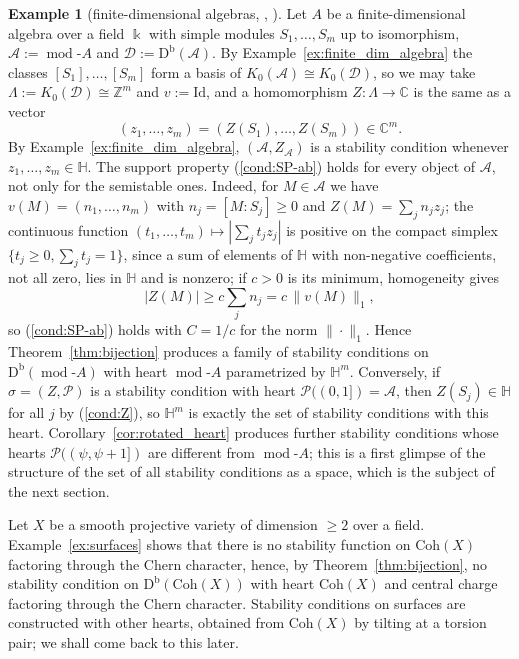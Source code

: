 \documentclass[12pt]{amsart}
\newcommand{\condref}[1]{\textup{(\ref{#1})}}
\newenvironment{remark}{{\textbf{Remark.}}}
\numberwithin{theorem}{section}
\theoremstyle{definition}
\newtheorem{example}[theorem]{Example}
\newcommand{\D}{\mathrm{D}}
\newcommand{\CC}{\mathbb{C}}
\newcommand{\ZZ}{\mathbb{Z}}
\newcommand{\HH}{\mathbb{H}}
\newcommand{\calA}{\mathcal{A}}
\newcommand{\calP}{\mathcal{P}}
\newcommand{\kk}{\Bbbk}
\newcommand{\id}{\mathrm{Id}}
\newcommand{\Kgroup}{K_0}
\newcommand{\calD}{\mathcal{D}}
\begin{document}
	\begin{example}[finite-dimensional algebras, {\cite[Example~5.5]{Bri07}}, {\cite[Exercise~5.13]{MS17}}]
		\label{ex:algebras_bridgeland}
		Let $A$ be a finite-dimensional algebra over a field $\kk$ with simple modules $S_1, \ldots, S_m$ up to isomorphism, $\calA := \operatorname{mod}\text{-}A$ and $\calD := \D^{\mathrm{b}}(\calA)$.
		By Example~\ref{ex:finite_dim_algebra} the classes $[S_1], \ldots, [S_m]$ form a basis of $\Kgroup(\calA) \cong \Kgroup(\calD)$, so we may take $\Lambda := \Kgroup(\calD) \cong \ZZ^m$ and $v := \id$, and a homomorphism $Z \colon \Lambda \to \CC$ is the same as a vector 
		\[
		(z_1, \ldots, z_m) = (Z(S_1), \ldots, Z(S_m)) \in \CC^m.
		\]
		By Example~\ref{ex:finite_dim_algebra}, $(\calA, Z_{\calA})$ is a stability condition whenever $z_1, \ldots, z_m \in \HH$.
		The support property \condref{cond:SP-ab} holds for every object of $\calA$, not only for the semistable ones.
		Indeed, for $M \in \calA$ we have $v(M) = (n_1, \ldots, n_m)$ with $n_j = [M : S_j] \geqslant 0$ and $Z(M) = \sum_j n_j z_j$;
		the continuous function $(t_1, \ldots, t_m) \mapsto |\sum_j t_j z_j|$ is positive on the compact simplex $\{ t_j \geqslant 0, \sum_j t_j = 1 \}$, since a sum of elements of $\HH$ with non-negative coefficients, not all zero, lies in $\HH$ and is nonzero;
		if $c > 0$ is its minimum, homogeneity gives 
		\[
		|Z(M)| \geqslant c \sum_j n_j = c \, \| v(M) \|_1,
		\] 
		so \condref{cond:SP-ab} holds with $C = 1 / c$ for the norm $\| \cdot \|_1$.
		Hence Theorem~\ref{thm:bijection} produces a family of stability conditions on $\D^{\mathrm{b}}(\operatorname{mod}\text{-}A)$ with heart $\operatorname{mod}\text{-}A$ parametrized by $\HH^m$.
		Conversely, if $\sigma = (Z, \calP)$ is a stability condition with heart $\calP((0, 1]) = \calA$, then $Z(S_j) \in \HH$ for all $j$ by \condref{cond:Z}, so $\HH^m$ is exactly the set of stability conditions with this heart.
		Corollary~\ref{cor:rotated_heart} produces further stability conditions whose hearts $\calP((\psi, \psi + 1])$ are different from $\operatorname{mod}\text{-}A$;
		this is a first glimpse of the structure of the set of all stability conditions as a space, which is the subject of the next section.
	\end{example}

	\begin{remark}
		Let $X$ be a smooth projective variety of dimension $\geqslant 2$ over a field.
		Example~\ref{ex:surfaces} shows that there is no stability function on $\mathrm{Coh}(X)$ factoring through the Chern character, hence, by Theorem~\ref{thm:bijection}, no stability condition on $\D^{\mathrm{b}}(\mathrm{Coh}(X))$ with heart $\mathrm{Coh}(X)$ and central charge factoring through the Chern character.
		Stability conditions on surfaces are constructed with other hearts, obtained from $\mathrm{Coh}(X)$ by tilting at a torsion pair;
		we shall come back to this later.
	\end{remark}
\end{document}
